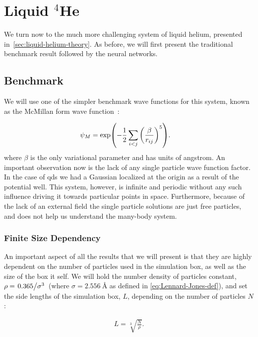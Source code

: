\documentclass[Thesis.tex]{subfiles}
\begin{document}
\chapter{Liquid $^4$He}
\label{chp:liquid-helium}

\glsresetall

We turn now to the much more challenging system of liquid helium, presented
in~\cref{sec:liquid-helium-theory}. As before, we will first present the
traditional benchmark result followed by the neural networks.


\section{Benchmark}

We will use one of the simpler benchmark wave functions for this system, known
as the McMillan form wave function~\cite{McMillan-1965}:

\begin{align}
  \label{eq:McMillan-wave-function-def}
  \psi_{M} &= \exp(-\frac{1}{2}\sum_{i<j} \qty(\frac{\beta}{r_{ij}})^5).
\end{align}
where $\beta$ is the only variational parameter and has units of angstrom. An
important observation now is the lack of any single particle wave function
factor. In the case of \glspl{qd} we had a Gaussian localized at the origin
as a result of the potential well. This system, however, is infinite and
periodic without any such influence driving it towards particular points in
space. Furthermore, because of the lack of an external field the single particle
solutions are just free particles, and does not help us understand the many-body
system.

\subsection{Finite Size Dependency}

An important aspect of all the results that we will present is that they are
highly dependent on the number of particles used in the simulation box, as well
as the size of the box it self. We will hold the number density of particles
constant, $\rho = \flatfrac{\num{0.365}}{\sigma^3}$ (where $\sigma =
\SI{2.556}{\angstrom}$ as defined in \cref{eq:Lennard-Jones-def}), and set the
side lengths of the simulation box, $L$, depending on
the number of particles $N$:

\begin{align}
  L = \sqrt[3]{\frac{N}{\rho}}.
\end{align}
\end{document}
